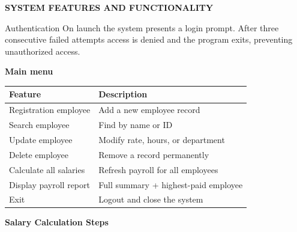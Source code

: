\documentclass[
]{article}
\newcounter{none} %
\begin{document}
\textbf{SYSTEM FEATURES AND FUNCTIONALITY}

Authentication On launch the system presents a login prompt. After three
consecutive failed attempts access is denied and the program exits,
preventing unauthorized access.

\textbf{Main menu}

{\def\LTcaptype{none} %
\begin{longtable}[]{@{}
  >{\raggedright\arraybackslash}p{}
  >{\raggedright\arraybackslash}p{}@{}}
\toprule\noalign{}
\begin{minipage}[b]{\linewidth}\raggedright
Feature
\end{minipage} & \begin{minipage}[b]{\linewidth}\raggedright
Description
\end{minipage} \\
\midrule\noalign{}
\endhead
\bottomrule\noalign{}
\endlastfoot
Registration employee & Add a new employee record \\
Search employee & Find by name or ID \\
Update employee & Modify rate, hours, or department \\
Delete employee & Remove a record permanently \\
Calculate all salaries & Refresh payroll for all employees \\
Display payroll report & Full summary + highest-paid employee \\
Exit & Logout and close the system \\
\end{longtable}
}

\textbf{Salary Calculation Steps}
\end{document}

